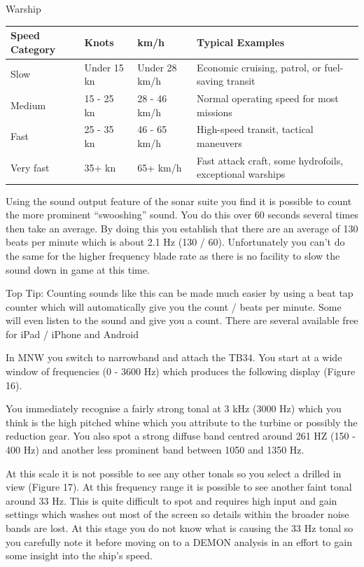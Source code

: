 Warship

\begin{tabularx}{\linewidth}{l l l X}
\toprule
\textbf{Speed Category} & \textbf{Knots} & \textbf{km/h} & \textbf{Typical Examples}\\
\midrule
\rowcolor[gray]{.9}Slow & Under 15 kn & Under 28 km/h & Economic cruising, patrol, or fuel-saving transit \\
Medium & 15 - 25 kn & 28 - 46 km/h & Normal operating speed for most missions \\
\rowcolor[gray]{.9}Fast & 25 - 35 kn & 46 - 65 km/h  & High-speed transit, tactical maneuvers\\
Very fast & 35+ kn & 65+ km/h & Fast attack craft, some hydrofoils, exceptional warships\\
\bottomrule
\end{tabularx}

Using the sound output feature of the sonar suite you find it is possible to count the more prominent “swooshing” sound. You do this over 60 seconds several times then take an average. By doing this you establish that there are an average of 130 beats per minute which is about 2.1 Hz (130 / 60). Unfortunately you can't do the same for the higher frequency blade rate as there is no facility to slow the sound down in game at this time.

Top Tip: Counting sounds like this can be made much easier by using a beat tap counter which will automatically give you the count / beats per minute. Some will even listen to the sound and give you a count. There are several available free for iPad / iPhone and Android

In MNW you switch to narrowband and attach the TB34. You start at a wide window of frequencies (0 - 3600 Hz) which produces the following display (Figure 16).

You immediately recognise a fairly strong tonal at 3 kHz (3000 Hz) which you think is the high pitched whine which you attribute to the turbine or possibly the reduction gear. You also spot a strong diffuse band centred around 261 HZ (150 - 400 Hz) and another less prominent band between 1050 and 1350 Hz.

At this scale it is not possible to see any other tonals so you select a drilled in view (Figure 17). At this frequency range it is possible to see another faint tonal around 33 Hz. This is quite difficult to spot and requires high input and gain settings which washes out most of the screen so details within the broader noise bands are lost. At this stage you do not know what is causing the 33 Hz tonal so you carefully note it before moving on to a DEMON analysis in an effort to gain some insight into the ship’s speed.

